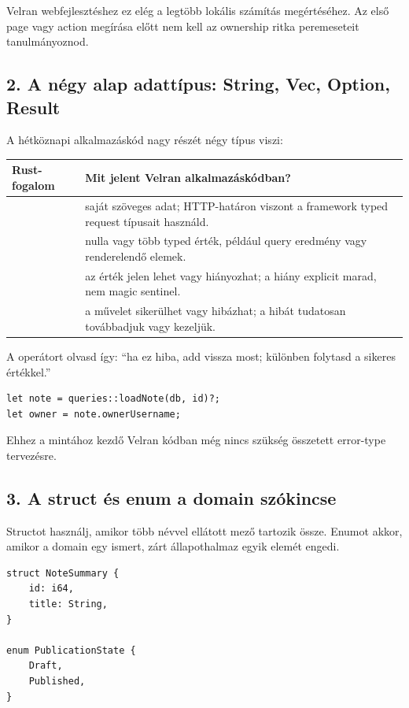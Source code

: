 Velran webfejlesztéshez ez elég a legtöbb lokális számítás megértéséhez. Az első page vagy action megírása előtt nem kell az ownership ritka peremeseteit tanulmányoznod.

\subsection*{2. A négy alap adattípus: String, Vec, Option, Result}

A hétköznapi alkalmazáskód nagy részét négy típus viszi:

\begin{center}
\begin{tabularx}{\textwidth}{@{}L{0.20\textwidth} Y@{}}
\toprule
\textbf{Rust-fogalom} & \textbf{Mit jelent Velran alkalmazáskódban?} \\
\midrule
{} & saját szöveges adat; HTTP-határon viszont a framework typed request típusait használd. \\
 & nulla vagy több typed érték, például query eredmény vagy renderelendő elemek. \\
 & az érték jelen lehet vagy hiányozhat; a hiány explicit marad, nem magic sentinel. \\
 & a művelet sikerülhet vagy hibázhat; a hibát tudatosan továbbadjuk vagy kezeljük. \\
\bottomrule
\end{tabularx}
\end{center}

A  operátort olvasd így: ``ha ez hiba, add vissza most; különben folytasd a sikeres értékkel.''

\begin{lstlisting}[language=Velran]
let note = queries::loadNote(db, id)?;
let owner = note.ownerUsername;
\end{lstlisting}

Ehhez a mintához kezdő Velran kódban még nincs szükség összetett error-type tervezésre.

\subsection*{3. A struct és enum a domain szókincse}

Structot használj, amikor több névvel ellátott mező tartozik össze. Enumot akkor, amikor a domain egy ismert, zárt állapothalmaz egyik elemét engedi.

\begin{lstlisting}[language=Velran]
struct NoteSummary {
    id: i64,
    title: String,
}

enum PublicationState {
    Draft,
    Published,
}
\end{lstlisting}

